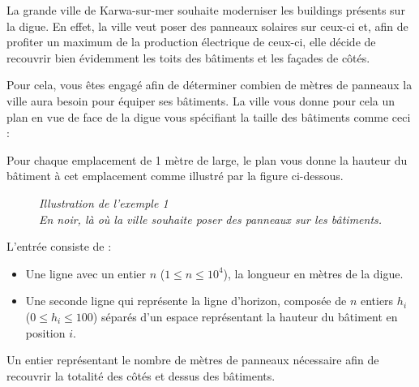 \problemname{\problemyamlname}

La grande ville de Karwa-sur-mer souhaite moderniser les buildings présents sur la digue.
En effet, la ville veut poser des panneaux solaires sur ceux-ci et, afin de profiter un maximum de la production électrique de ceux-ci, elle décide de recouvrir bien évidemment les toits des bâtiments et les façades de côtés.

Pour cela, vous êtes engagé afin de déterminer combien de mètres de panneaux la ville aura besoin pour équiper ses bâtiments.
La ville vous donne pour cela un plan en vue de face de la digue vous spécifiant la taille des bâtiments comme ceci :

Pour chaque emplacement de 1 mètre de large, le plan vous donne la hauteur du bâtiment à cet emplacement comme illustré par la figure ci-dessous.

\begin{figure}[h]
\centering
{}
\newline
\textit{Illustration de l'exemple 1 \\ En noir, là où la ville souhaite poser des panneaux sur les bâtiments.}
\end{figure}

\begin{Input}
	L'entrée consiste de :
	\begin{itemize}
		\item Une ligne avec un entier $n$ ($1 \le n \le 10^4$), la longueur en mètres de la digue.
		\item Une seconde ligne qui représente la ligne d'horizon, composée de $n$ entiers $h_i$ ($0 \le h_i \le 100$) séparés d'un espace représentant la hauteur du bâtiment en position $i$.
	\end{itemize}
\end{Input}

\begin{Output}
	Un entier représentant le nombre de mètres de panneaux nécessaire afin de recouvrir la totalité des côtés et dessus des bâtiments.
\end{Output}

